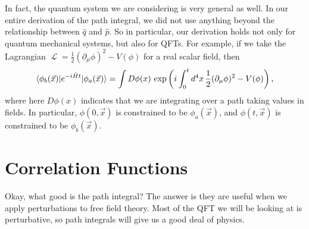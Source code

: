 \documentclass{report}
\theoremstyle{plain}
\theoremstyle{definition}
\theoremstyle{remark}
\DeclareMathOperator{\cL}{\mathcal{L}}
\begin{document}
In fact, the quantum system we are considering is very general as
well. In our entire derivation of the path integral, we did not use
anything beyond the relationship between $\hat{q}$ and $\hat{p}$. So
in particular, our derivation holds not only for quantum mechanical
systems, but also for QFTs. For example, if we take the Lagrangian
$\cL = \frac{1}{2} (\partial_\mu \phi)^2 - V(\phi)$ for a real scalar
field, then
$$ \braket{\phi_b(\vec{x}) | e^{-i\hat{H}t} | \phi_a(\vec{x})} = \int D\phi(x) \, \exp\left(i \int_0^t d^4x \, \frac{1}{2} (\partial_\mu \phi)^2 - V(\phi)\right), $$
where here $D\phi(x)$ indicates that we are integrating over a path
taking values in fields. In particular, $\phi(0, \vec{x})$ is
constrained to be $\phi_a(\vec{x})$, and $\phi(t, \vec{x})$ is
constrained to be $\phi_b(\vec{x})$.

\section{Correlation Functions}

Okay, what good is the path integral? The answer is they are useful
when we apply perturbations to free field theory. Most of the QFT we
will be looking at is perturbative, so path integrals will give us a
good deal of physics. 
\end{document}
